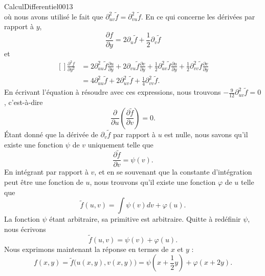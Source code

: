 \begin{corrige}{CalculDifferentiel0013}
\begin{equation}
	\end{equation}
	où nous avons utilisé le fait que $\partial^2_{uv}\tilde f=\partial^2_{vu}\tilde f$. En ce qui concerne les dérivées par rapport à $y$,
	\begin{equation}
		\frac{ \partial f }{ \partial y }=2\partial_u\tilde f+\frac{ 1 }{2}\partial_v\tilde f
	\end{equation}
	et
	\begin{equation}
		\begin{aligned}[]
			\frac{ \partial^2f }{ \partial y^2 }&=2\partial^2_{uu}\tilde f\frac{ \partial u }{ \partial y }+2\partial_{vu}\tilde f\frac{ \partial v }{ \partial y }+\frac{ 1 }{2}\partial^2_{uv}\tilde f\frac{ \partial u }{ \partial y }+\frac{ 1 }{2}\partial^2_{vv}\tilde f\frac{ \partial v }{ \partial y }\\
			&=4\partial^2_{uu}\tilde f+2\partial^2_{uv}\tilde f+\frac{1}{ 4 }\partial^2_{vv}\tilde f.
		\end{aligned}
	\end{equation}
	En écrivant l'équation à résoudre avec ces expressions, nous trouvons $-\frac{ 9 }{ 12 }\partial^2_{uv}\tilde f=0$, c'est-à-dire
	\begin{equation}
		\frac{ \partial  }{ \partial u }\left( \frac{ \partial \tilde f }{ \partial v } \right)=0.
	\end{equation}
	Étant donné que la dérivée de $\partial_v\tilde f$ par rapport à $u$ est nulle, nous savons qu'il existe une fonction $\psi$ de $v$ uniquement telle que
	\begin{equation}
		\frac{ \partial \tilde f }{ \partial v }=\psi(v).
	\end{equation}
	En intégrant par rapport à $v$, et en se souvenant que la constante d'intégration peut être une fonction de $u$, nous trouvons qu'il existe une fonction $\varphi$ de $u$ telle que
	\begin{equation}
		\tilde f(u,v)=\int\psi(v)dv+\varphi(u).
	\end{equation}
	La fonction $\psi$ étant arbitraire, sa primitive est arbitraire. Quitte à redéfinir $\psi$, nous écrivons
	\begin{equation}
		\tilde f(u,v)=\psi(v)+\varphi(u).
	\end{equation}
	Nous exprimons maintenant la réponse en termes de $x$ et $y$ :
	\begin{equation}
		f(x,y)=\tilde f\big( u(x,y),v(x,y) \big)=\psi(x+\frac{ 1 }{2}y)+\varphi(x+2y).
	\end{equation}

\end{corrige}
